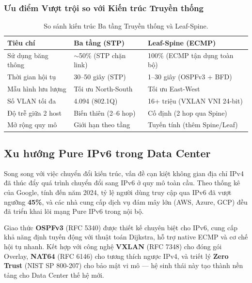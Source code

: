 \subsubsection{Ưu điểm Vượt trội so với Kiến trúc Truyền thống}

\begin{table}[H]
    \centering
    \caption{So sánh kiến trúc Ba tầng Truyền thống và Leaf-Spine.}
    \label{tab:arch_comparison}
    \begin{tabular}{|p{3.5cm}|p{5cm}|p{5cm}|}
        \hline
        \textbf{Tiêu chí} & \textbf{Ba tầng (STP)} & \textbf{Leaf-Spine (ECMP)} \\
        \hline
        Sử dụng băng thông & $\sim$50\% (STP chặn link) & 100\% (ECMP tận dụng toàn bộ) \\
        \hline
        Thời gian hội tụ & 30--50 giây (STP) & 1--30 giây (OSPFv3 + BFD) \\
        \hline
        Mẫu hình lưu lượng & Tối ưu North-South & Tối ưu East-West \\
        \hline
        Số VLAN tối đa & 4.094 (802.1Q) & 16+ triệu (VXLAN VNI 24-bit) \\
        \hline
        Độ trễ giữa 2 host & Biến thiên (2--6 hop) & Cố định (2 hop qua Spine) \\
        \hline
        Mở rộng quy mô & Giới hạn theo tầng & Tuyến tính (thêm Spine/Leaf) \\
        \hline
    \end{tabular}
\end{table}

\subsection{Xu hướng Pure IPv6 trong Data Center}

Song song với việc chuyển đổi kiến trúc, vấn đề cạn kiệt không gian địa chỉ IPv4 đã thúc đẩy quá trình chuyển đổi sang IPv6 ở quy mô toàn cầu. Theo thống kê của Google, tính đến năm 2024, tỷ lệ người dùng truy cập qua IPv6 đã vượt ngưỡng \textbf{45\%}, và các nhà cung cấp dịch vụ đám mây lớn (AWS, Azure, GCP) đều đã triển khai lõi mạng Pure IPv6 trong nội bộ.

Giao thức \textbf{OSPFv3} (RFC 5340) được thiết kế chuyên biệt cho IPv6, cung cấp khả năng định tuyến động với thuật toán Dijkstra, hỗ trợ native ECMP và cơ chế hội tụ nhanh. Kết hợp với công nghệ \textbf{VXLAN} (RFC 7348) cho đóng gói Overlay, \textbf{NAT64} (RFC 6146) cho tương thích ngược IPv4, và triết lý \textbf{Zero Trust} (NIST SP 800-207) cho bảo mật vi mô — hệ sinh thái này tạo thành nền tảng cho Data Center thế hệ mới.

